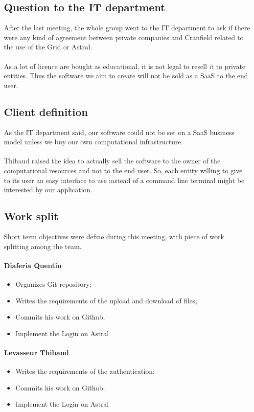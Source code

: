 \documentclass{cranfieldChart}
\begin{document}
\subsection*{Question to the IT department}
After the last meeting, the whole group went to the IT department to ask if there were any kind of agreement between private companies and Cranfield related to the use of the Grid or Astral.
\paragraph{} As a lot of licence are bought as educational, it is not legal to resell it to private entities. Thus the software we aim to create will not be sold as a SaaS to the end user.

\subsection*{Client definition}
As the IT department said, our software could not be set on a SaaS business model unless we buy our own computational infrastructure. 
\paragraph{}Thibaud raised the idea to actually sell the software to the owner of the computational resources and not to the end user. So, each entity willing to give to its user an easy interface to use instead of a command line terminal might be interested by our application.

\subsection*{Work split}
Short term objectives were define during this meeting, with piece of work splitting among the team.

\paragraph{Diaferia Quentin}
\begin{itemize}
	\item Organizes Git repository;
	\item Writes  the requirements of the upload and download of files;
	\item Commits his work on Github;
	\item Implement the Login on Astral
\end{itemize}

\paragraph{Levasseur Thibaud}
\begin{itemize}
	\item Writes  the requirements of the authentication;
	\item Commits his work on Github;
	\item Implement the Login on Astral
\end{itemize}
\end{document}
